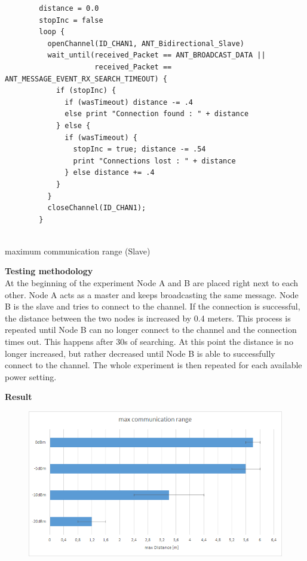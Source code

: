 \begin{description}
	\begin{code}[H]
		\begin{verbatim}
		distance = 0.0
		stopInc = false
		loop {
		  openChannel(ID_CHAN1, ANT_Bidirectional_Slave)
		  wait_until(received_Packet == ANT_BROADCAST_DATA || 
		             received_Packet == ANT_MESSAGE_EVENT_RX_SEARCH_TIMEOUT) {
		    if (stopInc) { 
		      if (wasTimeout) distance -= .4
		      else print "Connection found : " + distance
		    } else {
		      if (wasTimeout) { 
		        stopInc = true; distance -= .54
		        print "Connections lost : " + distance
		      } else distance += .4
		    }
		  }
		  closeChannel(ID_CHAN1);		
		}
		
		\end{verbatim}
		\caption{maximum communication range (Slave)}\label{lst:sExp6}
	\end{code}
	\item{\textbf{Testing methodology}} \hfill \\ At the beginning of the experiment Node A and B are placed right next to each other. Node A acts as a master and keeps broadcasting the same message. Node B is the slave and tries to connect to the channel. If the connection is successful, the distance between the two nodes is increased by 0.4 meters. This process is repeated until Node B can no longer connect to the channel and the connection times out. This happens after 30s of searching. At this point the distance is no longer increased, but rather decreased until Node B is able to successfully connect to the channel. The whole experiment is then repeated for each available power setting.	
	\item{\textbf{Result}} \hfill \\ 
	\begin{figure}[H]
		\centering
		\includegraphics[scale=0.5]{./pics/exp6.png}

\end{figure}
\end{description}

